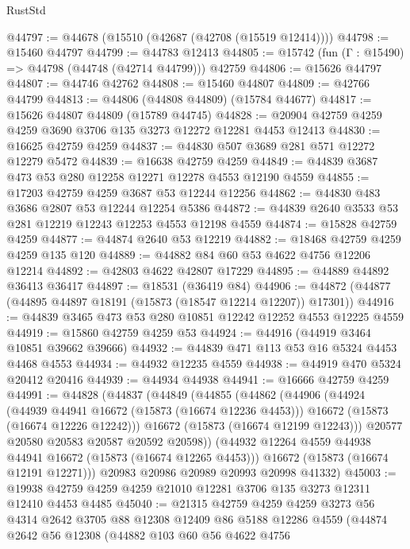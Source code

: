 \begin{lexlean}{RustStd}
\begin{coremodule}
@44797 := @44678 (@15510 (@42687 (@42708 (@15519 @12414))))
@44798 := @15460 @44797
@44799 := @44783 @12413
@44805 := @15742 (fun (Γ : @15490) => @44798 (@44748 (@42714 @44799))) @42759
@44806 := @15626 @44797
@44807 := @44746 @42762
@44808 := @15460 @44807
@44809 := @42766 @44799
@44813 := @44806 (@44808 @44809) (@15784 @44677)
@44817 := @15626 @44807 @44809 (@15789 @44745)
@44828 := @20904 @42759 @4259 @4259 @3690 @3706 @135 @3273 @12272 @12281 @4453 @12413
@44830 := @16625 @42759 @4259
@44837 := @44830 @507 @3689 @281 @571 @12272 @12279 @5472
@44839 := @16638 @42759 @4259
@44849 := @44839 @3687 @473 @53 @280 @12258 @12271 @12278 @4553 @12190 @4559
@44855 := @17203 @42759 @4259 @3687 @53 @12244 @12256
@44862 := @44830 @483 @3686 @2807 @53 @12244 @12254 @5386
@44872 := @44839 @2640 @3533 @53 @281 @12219 @12243 @12253 @4553 @12198 @4559
@44874 := @15828 @42759 @4259
@44877 := @44874 @2640 @53 @12219
@44882 := @18468 @42759 @4259 @4259 @135 @120
@44889 := @44882 @84 @60 @53 @4622 @4756 @12206 @12214
@44892 := @42803 @4622 @42807 @17229
@44895 := @44889 @44892 @36413 @36417
@44897 := @18531 (@36419 @84)
@44906 := @44872 (@44877 (@44895 @44897 @18191 (@15873 (@18547 @12214 @12207)) @17301))
@44916 := @44839 @3465 @473 @53 @280 @10851 @12242 @12252 @4553 @12225 @4559
@44919 := @15860 @42759 @4259 @53
@44924 := @44916 (@44919 @3464 @10851 @39662 @39666)
@44932 := @44839 @471 @113 @53 @16 @5324 @4453 @4468 @4553
@44934 := @44932 @12235 @4559
@44938 := @44919 @470 @5324 @20412 @20416
@44939 := @44934 @44938
@44941 := @16666 @42759 @4259
@44991 := @44828
    (@44837
      (@44849
        (@44855
          (@44862
            (@44906
              (@44924
                (@44939 @44941 @16672 (@15873 (@16674 @12236 @4453)))
                @16672
                (@15873 (@16674 @12226 @12242)))
              @16672
              (@15873 (@16674 @12199 @12243)))
            @20577
            @20580
            @20583
            @20587
            @20592
            @20598))
        (@44932 @12264 @4559 @44938 @44941 @16672 (@15873 (@16674 @12265 @4453)))
        @16672
        (@15873 (@16674 @12191 @12271)))
      @20983
      @20986
      @20989
      @20993
      @20998
      @41332)
@45003 := @19938 @42759 @4259 @4259 @21010 @12281 @3706 @135 @3273 @12311 @12410 @4453 @4485
@45040 := @21315
    @42759
    @4259
    @4259
    @3273
    @56
    @4314
    @2642
    @3705
    @88
    @12308
    @12409
    @86
    @5188
    @12286
    @4559
    (@44874
      @2642
      @56
      @12308
      (@44882
        @103
        @60
        @56
        @4622
        @4756

\end{coremodule}
\end{lexlean}
